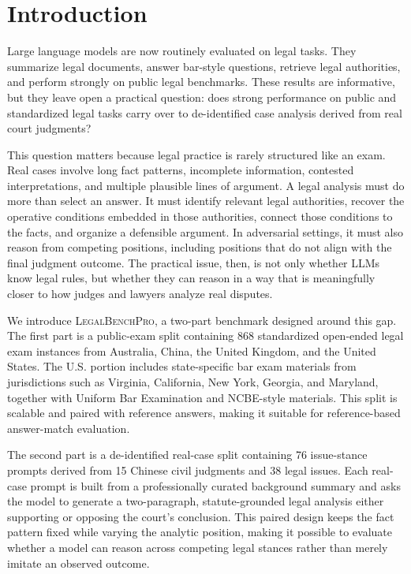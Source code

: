 \section{Introduction}

Large language models are now routinely evaluated on legal tasks. They summarize
legal documents, answer bar-style questions, retrieve legal authorities, and perform
strongly on public legal benchmarks. These results are informative, but they leave
open a practical question: does strong performance on public and standardized legal
tasks carry over to de-identified case analysis derived from real court judgments?

This question matters because legal practice is rarely structured like an exam. Real
cases involve long fact patterns, incomplete information, contested interpretations,
and multiple plausible lines of argument. A legal analysis must do more than select
an answer. It must identify relevant legal authorities, recover the operative
conditions embedded in those authorities, connect those conditions to the facts, and
organize a defensible argument. In adversarial settings, it must also reason from
competing positions, including positions that do not align with the final judgment
outcome. The practical issue, then, is not only whether LLMs know legal rules, but
whether they can reason in a way that is meaningfully closer to how judges and
lawyers analyze real disputes.

We introduce \textsc{LegalBenchPro}, a two-part benchmark designed around this gap.
The first part is a public-exam split containing 868 standardized open-ended legal
exam instances from Australia, China, the United Kingdom, and the United States. The
U.S. portion includes state-specific bar exam materials from jurisdictions such as
Virginia, California, New York, Georgia, and Maryland, together with Uniform Bar
Examination and NCBE-style materials. This split is scalable and paired with
reference answers, making it suitable for reference-based answer-match evaluation.

The second part is a de-identified real-case split containing 76 issue-stance prompts
derived from 15 Chinese civil judgments and 38 legal issues. Each real-case prompt is
built from a professionally curated background summary and asks the model to generate
a two-paragraph, statute-grounded legal analysis either supporting or opposing the
court's conclusion. This paired design keeps the fact pattern fixed while varying the
analytic position, making it possible to evaluate whether a model can reason across
competing legal stances rather than merely imitate an observed outcome.

